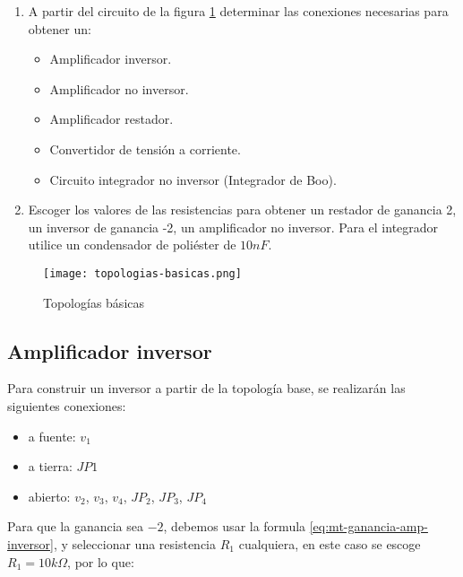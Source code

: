 \begin{enumerate}
    \item A partir del circuito de la figura \ref{fig:topologias-basicas} determinar las conexiones necesarias para obtener un:
        \begin{itemize}
            \item Amplificador inversor.
            \item Amplificador no inversor.
            \item Amplificador restador.
            \item Convertidor de tensión a corriente.
            \item Circuito integrador no inversor (Integrador de Boo).
        \end{itemize}

    \item Escoger los valores de las resistencias para obtener un restador de ganancia 2, un inversor de ganancia -2, un amplificador no inversor. Para el integrador utilice un condensador de poliéster de $10nF$.

\end{enumerate}

\begin{figure}[ht]
    \centering
    \texttt{[image: topologias-basicas.png]}
    \caption{Topologías básicas}
    \label{fig:topologias-basicas}
\end{figure}

\subsection{Amplificador inversor}

Para construir un inversor a partir de la topología base, se realizarán las siguientes conexiones:

\newcommand{\volt}[1]{$v_{#1}$}
\newcommand{\curr}[1]{$i_{#1}$}
\newcommand{\jumper}[1]{$JP_{#1}$}

\begin{itemize}
    \item a fuente: $v_1$
    \item a tierra: $JP1$
    \item abierto: \volt{2}, \volt{3}, \volt{4}, \jumper{2}, \jumper{3}, \jumper{4}
\end{itemize}

Para que la ganancia sea $-2$, debemos usar la formula \ref{eq:mt-ganancia-amp-inversor}, y seleccionar una resistencia $R_1$ cualquiera, en este caso se escoge $R_1 = 10k\Omega$, por lo que:

